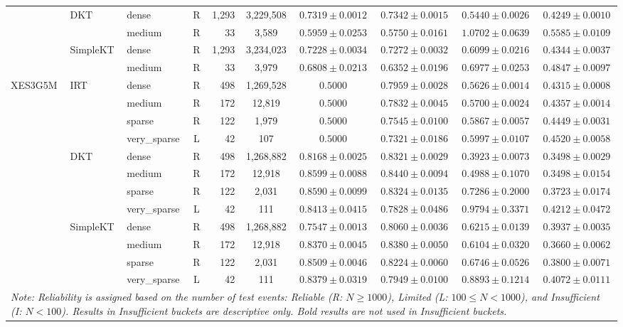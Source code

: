 \begin{table}[tbp]
{\begin{tabular}{lllcrccccc}
 & DKT & dense & R & 1,293 & 3,229,508 & $0.7319 \pm 0.0012$ & $0.7342 \pm 0.0015$ & $0.5440 \pm 0.0026$ & $0.4249 \pm 0.0010$ \\
 &  & medium & R & 33 & 3,589 & $0.5959 \pm 0.0253$ & $0.5750 \pm 0.0161$ & $1.0702 \pm 0.0639$ & $0.5585 \pm 0.0109$ \\
 & SimpleKT & dense & R & 1,293 & 3,234,023 & $0.7228 \pm 0.0034$ & $0.7272 \pm 0.0032$ & $0.6099 \pm 0.0216$ & $0.4344 \pm 0.0037$ \\
 &  & medium & R & 33 & 3,979 & $0.6808 \pm 0.0213$ & $0.6352 \pm 0.0196$ & $0.6977 \pm 0.0253$ & $0.4847 \pm 0.0097$ \\
\midrule
XES3G5M & IRT & dense & R & 498 & 1,269,528 & $0.5000$ & $0.7959 \pm 0.0028$ & $0.5626 \pm 0.0014$ & $0.4315 \pm 0.0008$ \\
 &  & medium & R & 172 & 12,819 & $0.5000$ & $0.7832 \pm 0.0045$ & $0.5700 \pm 0.0024$ & $0.4357 \pm 0.0014$ \\
 &  & sparse & R & 122 & 1,979 & $0.5000$ & $0.7545 \pm 0.0100$ & $0.5867 \pm 0.0057$ & $0.4449 \pm 0.0031$ \\
 &  & very\_sparse & L & 42 & 107 & $0.5000$ & $0.7321 \pm 0.0186$ & $0.5997 \pm 0.0107$ & $0.4520 \pm 0.0058$ \\
 & DKT & dense & R & 498 & 1,268,882 & $0.8168 \pm 0.0025$ & $0.8321 \pm 0.0029$ & $0.3923 \pm 0.0073$ & $0.3498 \pm 0.0029$ \\
 &  & medium & R & 172 & 12,918 & $0.8599 \pm 0.0088$ & $0.8440 \pm 0.0094$ & $0.4988 \pm 0.1070$ & $0.3498 \pm 0.0154$ \\
 &  & sparse & R & 122 & 2,031 & $0.8590 \pm 0.0099$ & $0.8324 \pm 0.0135$ & $0.7286 \pm 0.2000$ & $0.3723 \pm 0.0174$ \\
 &  & very\_sparse & L & 42 & 111 & $0.8413 \pm 0.0415$ & $0.7828 \pm 0.0486$ & $0.9794 \pm 0.3371$ & $0.4212 \pm 0.0472$ \\
 & SimpleKT & dense & R & 498 & 1,268,882 & $0.7547 \pm 0.0013$ & $0.8060 \pm 0.0036$ & $0.6215 \pm 0.0139$ & $0.3937 \pm 0.0035$ \\
 &  & medium & R & 172 & 12,918 & $0.8370 \pm 0.0045$ & $0.8380 \pm 0.0050$ & $0.6104 \pm 0.0320$ & $0.3660 \pm 0.0062$ \\
 &  & sparse & R & 122 & 2,031 & $0.8509 \pm 0.0046$ & $0.8224 \pm 0.0060$ & $0.6746 \pm 0.0526$ & $0.3800 \pm 0.0071$ \\
 &  & very\_sparse & L & 42 & 111 & $0.8379 \pm 0.0319$ & $0.7949 \pm 0.0100$ & $0.8893 \pm 0.1214$ & $0.4072 \pm 0.0111$ \\
\bottomrule
\multicolumn{10}{p{8.2cm}}{\scriptsize \textit{Note: Reliability is assigned based on the number of test events: Reliable (R: $N \ge 1000$), Limited (L: $100 \le N < 1000$), and Insufficient (I: $N < 100$). Results in Insufficient buckets are descriptive only. Bold results are not used in Insufficient buckets.}} \\
\end{tabular}%
}
\end{table}
